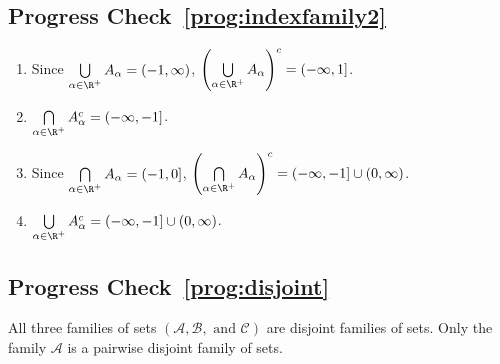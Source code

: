 \subsection*{Progress Check~\ref{prog:indexfamily2}}
\begin{enumerate}
  \item Since $\bigcup\limits_{\alpha \in \R^+}^{}A_\alpha = \left( -1, \infty \right)$, $\left( \bigcup\limits_{\alpha \in \R^+}^{}A_\alpha \right)^c = 
(-\infty, 1 ]$.

  \item $\bigcap\limits_{\alpha \in \R^+}^{}A_{\alpha}^c = (-\infty, -1]$.

  \item Since $\bigcap\limits_{\alpha \in \R^+}^{}A_\alpha = \left( -1, 0 \right]$, 
$\left( \bigcap\limits_{\alpha \in \R^+}^{}A_\alpha \right)^c = (-\infty, -1] \cup (0, \infty)$.

  \item $\bigcup\limits_{\alpha \in \R^+}^{}A_{\alpha}^c = (-\infty, -1] \cup (0, \infty)$.
\end{enumerate}



\subsection*{Progress Check~\ref{prog:disjoint}}
All three families of sets $\left( \mathscr{A}, \mathscr{B}, \text{ and }\mathscr{C} \right)$ are disjoint families of sets.  Only the family $\mathscr{A}$ is a pairwise disjoint family of sets.
\hbreak

\endinput

